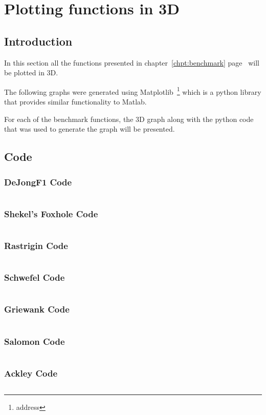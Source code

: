 \appendix
\chapter{Plotting functions in 3D}
\section{Introduction}
In this section all the functions presented in chapter~\ref{chpt:benchmark} page~\pageref{chpt:benchmark} will be plotted in 3D.

The following graphs were generated using Matplotlib~\footnote{address} which is a python library that provides similar functionality to Matlab.

For each of the benchmark functions, the 3D graph along with the python code that was used to generate the graph will be presented.

\section{Code}
\subsection{DeJongF1 Code}
\inputminted[fontsize=\tiny]{python}{./Graphs/dejongf1.py}
\subsection{Shekel's Foxhole Code}
\inputminted[fontsize=\tiny]{python}{./Graphs/shekelsfoxhole.py}
\subsection{Rastrigin Code}
\inputminted[fontsize=\tiny]{python}{./Graphs/rastrigin.py}
\subsection{Schwefel Code}
\inputminted[fontsize=\tiny]{python}{./Graphs/Schwefel.py}
\subsection{Griewank Code}
\inputminted[fontsize=\tiny]{python}{./Graphs/Griewank.py}
\subsection{Salomon Code}
\inputminted[fontsize=\tiny]{python}{./Graphs/Salomon.py}
\subsection{Ackley Code}
\inputminted[fontsize=\tiny]{python}{./Graphs/Ackley.py}
